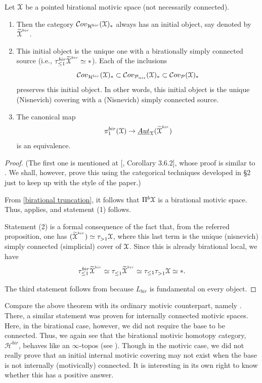 \begin{thm}\label{initial object of bir cov}
Let $\EuScript{X}$ be a pointed birational motivic space (not necessarily connected). 
\begin{enumerate}
    \item Then the category $\mathcal{C}ov_{\mathcal{H}^{bir}}(\EuScript{X})_*$ always has an initial object, say denoted by ${\widetilde{{\EuScript{X}}}}^{^{bir}}$.
    \item This initial object is the unique one with a birationally simply connected source (i.e., $\tau_{\leq 1}^{bir}{\widetilde{{\EuScript{X}}}}^{^{bir}}\simeq *$). Each of the inclusions  $$\mathcal{C}ov_{\mathcal{H}^{bir}}(\EuScript{X})_*\subset \mathcal{C}ov_{\mathcal{P}_{nis}}(\EuScript{X})_*\subset \mathcal{C}ov_{\mathcal{P}_{}}(\EuScript{X})_* $$ preserves this initial object. In other words, this initial object is the unique (Nisnevich) covering with a (Nisnevich) simply connected source.
    \item The canonical map $$ \pi_1^{bir}(\EuScript{X})\to \underline{Aut}_{\EuScript{X}}(\widetilde{{\EuScript{X}}}^{^{bir}})$$ is an equivalence.
\end{enumerate}
\end{thm}
\begin{proof}
  (The first one is mentioned at [\cite{0bat}, Corollary 3.6.2], whose proof is similar to . We shall, however, prove this using the categorical techniques developed in \S2 just to keep up with the style of the paper.)
     
 From \cref{birational truncation}, it follows that $\Pi^{b}\EuScript{X}$ is a birational motivic space. Thus,  applies, and statement (1) follows. 
    
Statement (2) is a formal consequence of the fact that, from the referred proposition, one has $(\widetilde{{\EuScript{X}}}^{^{bir}})\simeq \tau_{>1}^{}\EuScript{X}$, where this last term is the unique (nisnevich) simply connected (simplicial) cover of $\EuScript{X}$. Since this is already birational local, we have $$\tau_{\leq 1}^{bir}{\widetilde{{\EuScript{X}}}}^{^{bir}}\simeq \tau_{\leq 1}^{}{\widetilde{{\EuScript{X}}}}^{^{bir}}\simeq \tau_{\leq 1}\tau_{>1}^{}\EuScript{X}\simeq *.$$
    
The third statement follows from  because $L_{bir}$ is fundamental on every object.
\end{proof}

\begin{rem}
    Compare the above theorem with its ordinary motivic counterpart, namely . There, a similar statement was proven for internally connected motivic spaces. Here, in the birational case, however, we did not require the base to be connected. Thus, we again see that the birational motivic homotopy category, $\mathcal{H}^{bir}$, behaves like an $\infty$-topos (see ). Though in the motivic case, we did not really prove that an initial internal motivic covering may not exist when the base is not internally (motivically) connected. It is interesting in its own right to know whether this has a positive answer.
    \end{rem}

